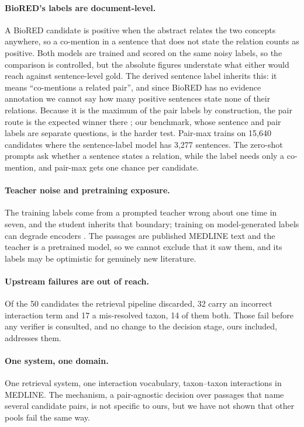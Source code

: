 \documentclass[11pt]{article}
\begin{document}
\paragraph{BioRED's labels are document-level.}
A BioRED candidate is positive when the abstract relates the two concepts anywhere, so a co-mention
in a sentence that does not state the relation counts as positive. Both models are trained and scored
on the same noisy labels, so the comparison is controlled, but the absolute figures understate what
either would reach against sentence-level gold. The derived sentence label inherits this: it means
``co-mentions a related pair'', and since BioRED has no evidence annotation we cannot say how many
positive sentences state none of their relations. Because it is the maximum of the pair labels by
construction, the pair route is the expected winner there \citep[cf.][]{li2021dual}; our benchmark, whose
sentence and pair labels are separate questions, is the harder test. Pair-max trains on 15{,}640 candidates where the sentence-label model has 3{,}277
sentences. The zero-shot prompts ask whether a sentence states a relation, while the label needs only
a co-mention, and pair-max gets one chance per candidate.

\paragraph{Teacher noise and pretraining exposure.}
The training labels come from a prompted teacher wrong about one time in seven, and the student
inherits that boundary; training on model-generated labels can degrade encoders
\citep{lu2025feeding}. The passages are published MEDLINE text and the teacher is a pretrained
model, so we cannot exclude that it saw them, and its labels may be optimistic for genuinely new
literature.

\paragraph{Upstream failures are out of reach.}
Of the 50 candidates the retrieval pipeline discarded, 32 carry an incorrect interaction term and 17
a mis-resolved taxon, 14 of them both. Those fail before any verifier is consulted, and no change to
the decision stage, ours included, addresses them.

\paragraph{One system, one domain.}
One retrieval system, one interaction vocabulary, taxon--taxon interactions in MEDLINE. The mechanism, a pair-agnostic decision over passages that name several candidate pairs, is not specific to
ours, but we have not shown that other pools fail the same way.
\end{document}
